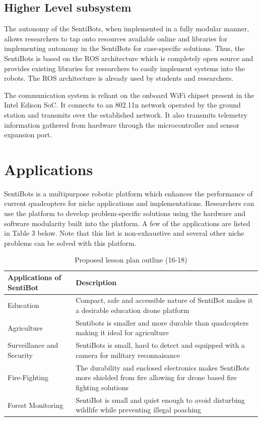 \documentclass[12pt]{article}
\begin{document}
\subsection{Higher Level subsystem}

The autonomy of the SentiBots, when implemented in a fully modular manner, allows researchers to tap onto resources available online and libraries for implementing autonomy in the SentiBots for case-specific solutions. Thus, the SentiBots is based on the ROS architecture which is completely open source and provides existing libraries for researchers to easily implement systems into the robots. The ROS architecture is already used by students and researchers.

The communication system is reliant on the onboard WiFi chipset present in the Intel Edison SoC. It connects to an 802.11n network operated by the ground station and transmits over the established network. It also transmits telemetry information gathered from hardware through the microcontroller and sensor expansion port.

\section{Applications}

SentiBots is a multipurpose robotic platform which enhances the performance of current quadcopters for niche applications and implementations. Researchers can use the platform to develop problem-specific solutions using the hardware and software modularity built into the platform. A few of the applications are listed in Table 3 below. Note that this list is non-exhaustive and several other niche problems can be solved with this platform.

\begin{table}[h]
	\centering
	\begin{tabularx}{\linewidth}{ | >{\setlength\hsize{.3\hsize}} X | >{\setlength\hsize{.5\hsize}} X }
		Applications of SentiBot & Description \\
		\hline
		Education & Compact, safe and accessible nature of SentiBot makes it a desirable education drone platform \\
		Agriculture &  Sentibots is smaller and more durable than quadcopters making it ideal for agriculture \\
		Surveillance and Security & SentiBots is small, hard to detect and equipped with a camera for military reconnaisance  \\
		Fire-Fighting & The durability and enclosed electronics makes SentiBots more shielded from fire allowing for drone based fire fighting solutions \\
		Forest Monitoring & SentiBot is small and quiet enough to avoid disturbing wildlife while preventing illegal poaching \\
	\end{tabularx}
	\caption{Proposed lesson plan outline (16-18)}
	\label{tab:lessonplan1}
\end{table}
\end{document}
